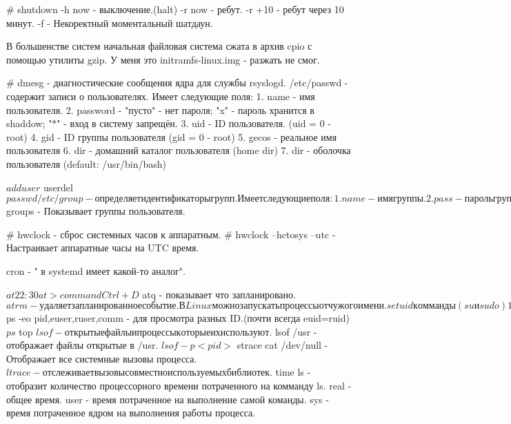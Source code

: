 # shutdown -h now - выключение.(halt)
           -r now - ребут.
           -r +10 - ребут через 10 минут.
           -f - Некоректный моментальный шатдаун.

В большенстве систем начальная файловая система сжата в архив cpio с помощью
утилиты gzip.
У меня это initramfs-linux.img - разжать не смог.

# dmesg     - диагностические сообщения ядра для службы rsyslogd.
/etc/passwd - содержит записи о пользователях. Имеет следующие поля:
1. name      - имя пользователя.
2. password  - "пусто" - нет пароля; "x" - пароль хранится в shaddow; "*" - вход 
               в систему запрещён.
3. uid       - ID пользователя. (uid = 0 - root)
4. gid       - ID группы пользователя (gid = 0 - root)
5. gecos     - реальное имя пользователя
6. dir       - домашний каталог пользователя (home dir)
7. dir       - оболочка пользователя (default: /usr/bin/bash) 

$ adduser
$ userdel
$ passwd

/etc/group - определяет идентификаторы групп. Имеет следующие поля:
1. name - имя группы.
2. pass - пароль группы.
3. GID  - ID группы.
4. user - участники группы в дополнение тем которые указаны в /etc/password

$ groups - Показывает группы пользователя.


# hwclock - сброс системных часов к аппаратным.
# hwclock --hctosys --utc - Настраивает аппаратные часы на UTC время.

cron - " в systemd имеет какой-то аналог".

$ at 22:30
at> command
Ctrl+D
$ atq - показывает что запланировано.
$ atrm - удаляет запланированное событие.

В Linux можно запускать процессы от чужого имени. setuid комманды (su и sudo)
1. euid - эфективный ID. (исполнитель)
2. ruid - реальный ID.   (владелец)
3. suid - сохраненный ID.
4. fsuid - ID пользователя файловой системой.

$ ps -eo pid,euser,ruser,comm - для просмотра разных ID.(почти всегда euid=ruid)
$ ps
$ top 
$ lsof - открытые файлы и процессы которые их используют.
$ lsof /usr - отображает файлы открытые в /usr.
$ lsof -p <pid>
$ strace cat /dev/null - Отображает все системные вызовы процесса.
$ ltrace - отслеживает вызовы совместно используемых библиотек.
$ time ls - отобразит количество процессорного времени потраченного на комманду ls.
real - общее время.
user - время потраченное на выполнение самой команды.
sys  - время потраченное ядром на выполнения работы процесса.

